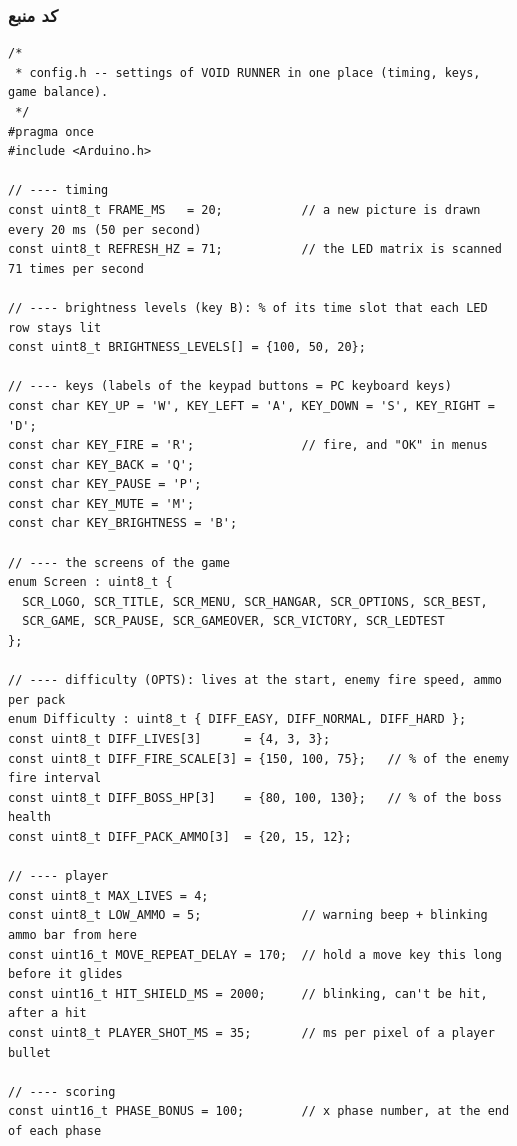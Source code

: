 \documentclass[11pt,a4paper]{article}
\begin{document}
\subsubsection*{کد منبع}
\begin{latin}
\begin{lstlisting}[language=Arduino]
/*
 * config.h -- settings of VOID RUNNER in one place (timing, keys, game balance).
 */
#pragma once
#include <Arduino.h>

// ---- timing
const uint8_t FRAME_MS   = 20;           // a new picture is drawn every 20 ms (50 per second)
const uint8_t REFRESH_HZ = 71;           // the LED matrix is scanned 71 times per second

// ---- brightness levels (key B): % of its time slot that each LED row stays lit
const uint8_t BRIGHTNESS_LEVELS[] = {100, 50, 20};

// ---- keys (labels of the keypad buttons = PC keyboard keys)
const char KEY_UP = 'W', KEY_LEFT = 'A', KEY_DOWN = 'S', KEY_RIGHT = 'D';
const char KEY_FIRE = 'R';               // fire, and "OK" in menus
const char KEY_BACK = 'Q';
const char KEY_PAUSE = 'P';
const char KEY_MUTE = 'M';
const char KEY_BRIGHTNESS = 'B';

// ---- the screens of the game
enum Screen : uint8_t {
  SCR_LOGO, SCR_TITLE, SCR_MENU, SCR_HANGAR, SCR_OPTIONS, SCR_BEST,
  SCR_GAME, SCR_PAUSE, SCR_GAMEOVER, SCR_VICTORY, SCR_LEDTEST
};

// ---- difficulty (OPTS): lives at the start, enemy fire speed, ammo per pack
enum Difficulty : uint8_t { DIFF_EASY, DIFF_NORMAL, DIFF_HARD };
const uint8_t DIFF_LIVES[3]      = {4, 3, 3};
const uint8_t DIFF_FIRE_SCALE[3] = {150, 100, 75};   // % of the enemy fire interval
const uint8_t DIFF_BOSS_HP[3]    = {80, 100, 130};   // % of the boss health
const uint8_t DIFF_PACK_AMMO[3]  = {20, 15, 12};

// ---- player
const uint8_t MAX_LIVES = 4;
const uint8_t LOW_AMMO = 5;              // warning beep + blinking ammo bar from here
const uint16_t MOVE_REPEAT_DELAY = 170;  // hold a move key this long before it glides
const uint16_t HIT_SHIELD_MS = 2000;     // blinking, can't be hit, after a hit
const uint8_t PLAYER_SHOT_MS = 35;       // ms per pixel of a player bullet

// ---- scoring
const uint16_t PHASE_BONUS = 100;        // x phase number, at the end of each phase
\end{lstlisting}

\end{latin}
\end{document}
